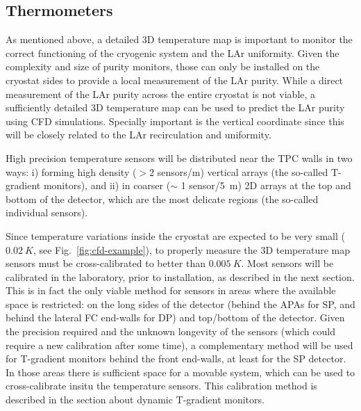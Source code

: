 \subsection{Thermometers}
\label{sec:fdgen-slow-cryo-therm}

As mentioned above, a detailed 3D temperature map is important to monitor the correct functioning of the cryogenic system and the LAr uniformity.
Given the complexity and size of purity monitors, those can only be installed on the cryostat sides to provide a local measurement of
the LAr purity. While a direct measurement of the LAr purity across the entire cryostat is not viable, a sufficiently detailed 3D temperature map
can be used to predict the LAr purity using CFD simulations. Specially important is the vertical coordinate since this will be closely related to
the LAr recirculation and uniformity. 

High precision temperature sensors will be distributed near the TPC walls in two ways:
i) forming high density (\(>2\) sensors/\si{m}) vertical arrays (the so-called T-gradient monitors), and ii) in coarser ($\sim$ 1 sensor/\SI{5}{m}) 2D arrays 
at the top and bottom of the detector, which are the most delicate regions (the so-called individual sensors).   

Since temperature variations inside the cryostat are expected to be very small ($\SI{0.02}{K}$, see Fig.~\ref{fig:cfd-example}), to properly measure the 3D temperature map 
sensors must be cross-calibrated to better than $\SI{0.005}{K}$. Most sensors will be calibrated in the laboratory, prior to installation,
as described in the next section. This is in fact the only viable method for sensors in areas where the available space is restricted: on the long sides of the detector
(behind the APAs for SP, and behind the lateral FC end-walls for DP) and top/bottom of the detector.
Given the precision required and the unknown longevity of the sensors (which could require a new calibration after some time), a complementary method
will be used for T-gradient monitors behind the front end-walls, at least for the SP detector.
In those areas there is sufficient space for a movable system, which can be used to cross-calibrate insitu
the temperature sensors. This calibration method is described in the section about dynamic T-gradient monitors. 

